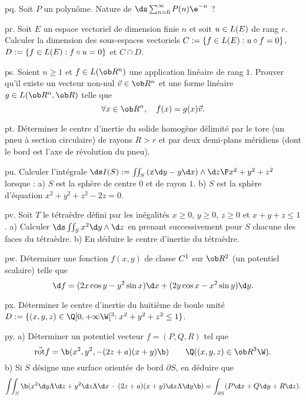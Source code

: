 \exo [Level=2,Fight=0,Learn=0,Type=\Exercices,Field=\SériesNumériques,Origin=] pq. 
Soit $P$ un polynôme. Nature de $\ds\sum_{n=0}^\infty P(n)\e^{-n}$ ?

\exo [Level=1,Fight=2,Learn=1,Type=\Exercices,Field=\EspacesVectoriels,Origin=] pr. 
Soit $E$ un espace vectoriel de dimension finie $n$ 
et soit $u\in\sc L(E)$ de rang $r$. Calculer la dimension 
des sous-espaces vectoriels $C:=\{f\in\sc L(E): u\circ f=0\}$, 
$D:=\{f\in\sc L(E):f\circ u=0\}$ et $C\cap D$. 

\exo [Origin=,Level=1,Fight=3,Learn=1,Type=\Colles,Field=\EspacesVectoriels] ps. 
Soient $n\ge1$ et $f\in\sc L(\ob R^n)$ une application linéaire de rang $1$. 
Prouver qu'il existe un vecteur non-nul $\vec v\in\ob R^n$ 
et une forme linéaire $g\in\sc L(\ob R^n,\ob R)$ telle que 
$$
\forall x\in\ob R^n,\quad f(x)= g(x)\vec v.  
$$ 

\exo [Level=2,Fight=0,Learn=0,Type=\Exercices,Field=\IntégralesMultiples,Origin=] pt. 
Déterminer le centre d'inertie du solide homogène délimité par le tore 
(un pneu à section circulaire) de rayons $R>r$ et par deux demi-plans méridiens 
(dont le bord est l'axe de révolution du pneu). 

\exo [Level=2,Fight=0,Learn=0,Type=\Exercices,Field=\Intégrales Multiples,Origin=] pu. 
Calculer l'intégrale $\ds I(S):=\int\!\!\int_S{(x\d y-y\d x)\wedge\d z\F x^2+y^2+z^2}$ 
lorsque  : \pn
a) $S$ est la sphère de centre $0$ et de rayon $1$. \pn
b) $S$ est la sphère d'équation $x^2+y^2+z^2-2z=0$. 

\exo [Level=2,Fight=0,Learn=0,Type=\Exercices,Field=\IntégralesMultiples,Origin=] pv. 
Soit $T$ le tétraèdre défini par les inégalités $x\ge0$, $y\ge0$, $z\ge0$ et $x+y+z\le 1$. 
\pn
a) Calculer $\ds\int\!\!\int_Sx^2\d y\wedge\d z$ en prenant successivement pour $S$ 
chacune des faces du tétraèdre. \pn
b) En déduire le centre d'inertie du tétraèdre. 

\exo [Level=2,Fight=0,Learn=0,Type=\Exercices,Field=\FonctionsDePlusieursVariables|\PotentielsScalaires,Origin=] pw.  
Déterminer une fonction $f(x,y)$ de classe $\sc C^1$ sur $\ob R^2$ 
(un potentiel scalaire) telle que 
$$
\d f=(2x\cos y-y^2\sin x)\d x+(2y\cos x-x^2\sin y)\d y.
$$ 

\exo [Level=2,Fight=0,Learn=0,Type=\Exercices,Field=\IntégralesMultiples,Origin=] px. 
Déterminer le centre d'inertie du huitième 
de boule unité $D:=\{(x,y,z)\in\Q[0,+\infty\W[^3:x^2+y^2+z^2\le1\}$. 

\exo [Level=2,Fight=0,Learn=0,Type=\Exercices,Field=\FonctionsDePlusieursVariables|\PotentielsVecteurs,Origin=] py. 
a) Déterminer un potentiel vecteur $f=(P,Q,R)$ 
tel que 
$$
\vec{\hbox{\rm rot}} f=\b(x^2,y^2,-(2z+a)(x+y)\b)\qquad\Q((x,y,z)\in\ob R^3\W).
$$ 
b) Si $S$ désigne une surface orientée de bord $\partial S$, en déduire que  
$$
\int\!\!\int_S\b(x^2\d y\Lambda\d z+y^2\d z\Lambda\d x-(2z+a)(x+y)\d x\Lambda\d y\b)
=\int_{\partial S}(P\d x+Q\d y+R\d z).
$$ 

